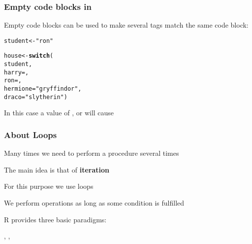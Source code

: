 \documentclass[12pt]{beamer}\usepackage[]{graphicx}\usepackage[]{color}
\makeatletter
\newcommand{\hlstr}[1]{\textcolor[rgb]{0.192,0.494,0.8}{#1}}%
\newcommand{\hlstd}[1]{\textcolor[rgb]{0.345,0.345,0.345}{#1}}%
\newcommand{\hlkwb}[1]{\textcolor[rgb]{0.69,0.353,0.396}{#1}}%
\newcommand{\hlkwc}[1]{\textcolor[rgb]{0.333,0.667,0.333}{#1}}%
\newcommand{\hlkwd}[1]{\textcolor[rgb]{0.737,0.353,0.396}{\textbf{#1}}}%
\newenvironment{kframe}{%
 \def\at@end@of@kframe{}%
 \ifinner\ifhmode%
  \def\at@end@of@kframe{\end{minipage}}%
  \begin{minipage}{\columnwidth}%
 \fi\fi%
 \def\FrameCommand##1{\hskip\@totalleftmargin \hskip-\fboxsep
 \colorbox{shadecolor}{##1}\hskip-\fboxsep
     \hskip-\linewidth \hskip-\@totalleftmargin \hskip\columnwidth}%
 \MakeFramed {\advance\hsize-\width
   \@totalleftmargin\z@ \linewidth\hsize
   \@setminipage}}%
 {\par\unskip\endMakeFramed%
 \at@end@of@kframe}
\newenvironment{knitrout}{}{} %
\makeatother
\begin{document}

\begin{frame}[fragile]
\frametitle{Empty code blocks in }

Empty code blocks can be used to make several tags match the same code block:

\begin{knitrout}\footnotesize
{}\color{fgcolor}\begin{kframe}
\begin{alltt}
\hlstd{student} \hlkwb{<-} \hlstr{"ron"}

\hlstd{house} \hlkwb{<-} \hlkwd{switch}\hlstd{(}
  \hlstd{student,}
  \hlkwc{harry} \hlstd{= ,}
  \hlkwc{ron} \hlstd{= ,}
  \hlkwc{hermione} \hlstd{=} \hlstr{"gryffindor"}\hlstd{,}
  \hlkwc{draco} \hlstd{=} \hlstr{"slytherin"}\hlstd{)}
\end{alltt}
\end{kframe}
\end{knitrout}
In this case a value of ,  or  will cause 

\end{frame}


\begin{frame}
\begin{center}
\Huge{}
\end{center}
\end{frame}


\begin{frame}[fragile]
\frametitle{About Loops}

\bbi
  \item Many times we need to perform a procedure several times
  \item The main idea is that of \textbf{iteration}
  \item For this purpose we use loops
  \item We perform operations as long as some condition is fulfilled
  \item R provides three basic paradigms:
  \bi
    \item {}, , 
  \ei
\ei

\end{frame}
\end{document}
